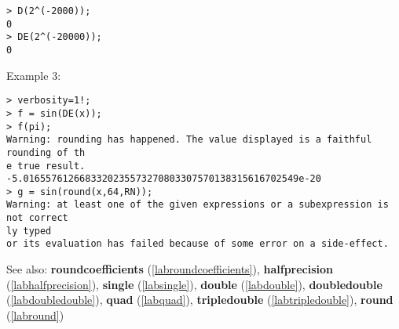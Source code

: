 \begin{center}\begin{minipage}{15cm}\begin{Verbatim}[frame=single]
> D(2^(-2000));
0
> DE(2^(-20000));
0
\end{Verbatim}
\end{minipage}\end{center}
\noindent Example 3: 
\begin{center}\begin{minipage}{15cm}\begin{Verbatim}[frame=single]
> verbosity=1!;
> f = sin(DE(x));
> f(pi);
Warning: rounding has happened. The value displayed is a faithful rounding of th
e true result.
-5.0165576126683320235573270803307570138315616702549e-20
> g = sin(round(x,64,RN));
Warning: at least one of the given expressions or a subexpression is not correct
ly typed
or its evaluation has failed because of some error on a side-effect.
\end{Verbatim}
\end{minipage}\end{center}
See also: \textbf{roundcoefficients} (\ref{labroundcoefficients}), \textbf{halfprecision} (\ref{labhalfprecision}), \textbf{single} (\ref{labsingle}), \textbf{double} (\ref{labdouble}), \textbf{doubledouble} (\ref{labdoubledouble}), \textbf{quad} (\ref{labquad}), \textbf{tripledouble} (\ref{labtripledouble}), \textbf{round} (\ref{labround})
